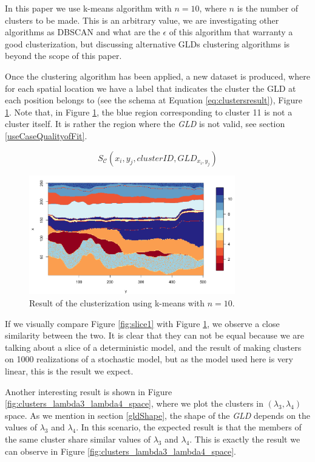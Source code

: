 In this paper we use k-means algorithm with $n=10$, where $n$ is the number of clusters to be made. This is an arbitrary value, we are investigating other algorithms as DBSCAN and what are the $\epsilon$ of this algorithm that warranty a good clusterization, but discussing alternative GLDs clustering algorithms is beyond the scope of this paper.

Once the clustering algorithm has been applied, a new dataset is produced, where for each spatial location we have a label that indicates the cluster the GLD at each position belongs to (see the schema at Equation \ref{eq:clustersresult}), Figure \ref{fig:clusters}. Note that, in Figure \ref{fig:clusters}, the blue region corresponding to cluster 11 is not a cluster itself. It is rather the region where the \textit{GLD} is not valid, see section \ref{useCaseQualityofFit}.

\begin{equation}\label{eq:clustersresult}
S_{\mathcal{C}}(x_{i},y_{j},clusterID, GLD_{x_{i},y_{j}})
\end{equation}

\begin{figure}[H]
    \centering
    \includegraphics[width=0.8\textwidth]{images/clusters1.png}
    \caption{Result of the clusterization using k-means with $n=10$.}
    \label{fig:clusters}
\end{figure}

If we visually compare Figure \ref{fig:slice1} with Figure \ref{fig:clusters}, we observe a close similarity between the two. It is clear that they can not be equal because we are talking about a slice of a deterministic model, and the result of making clusters on 1000 realizations of a stochastic model, but as the model used here is very linear, this is the result we expect.

Another interesting result is shown in Figure \ref{fig:clusters_lambda3_lambda4_space}, where we plot the clusters in $(\lambda_{3}, \lambda_{4})$ space. As we mention in section \ref{gldShape}, the shape of the \textit{GLD} depends on the values of $\lambda_{3}$ and $\lambda_{4}$. In this scenario, the expected result is that the members of the same cluster share similar values of $\lambda_{3}$ and $\lambda_{4}$. This is exactly the result we can observe in Figure \ref{fig:clusters_lambda3_lambda4_space}. 

